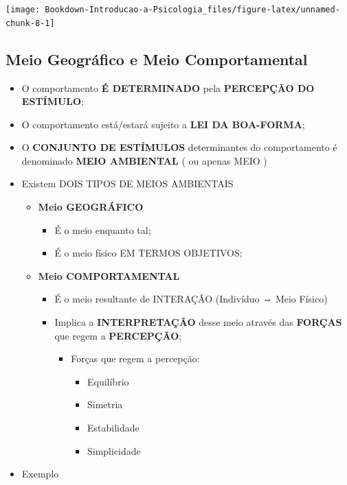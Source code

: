 \documentclass[
]{book}
\providecommand{\tightlist}{%
  \setlength{\itemsep}{0pt}\setlength{\parskip}{0pt}}
\begin{document}
\texttt{[image: Bookdown-Introducao-a-Psicologia\_files/figure-latex/unnamed-chunk-8-1]}

\hypertarget{meio-geogruxe1fico-e-meio-comportamental}{%
\subsection{Meio Geográfico e Meio Comportamental}\label{meio-geogruxe1fico-e-meio-comportamental}}

\begin{itemize}
\tightlist
\item
  O comportamento \textbf{É DETERMINADO} pela \textbf{PERCEPÇÃO DO
  ESTÍMULO};
\item
  O comportamento está/estará sujeito a \textbf{LEI DA BOA-FORMA};
\item
  O \textbf{CONJUNTO DE ESTÍMULOS} determinantes do comportamento é
  denominado \textbf{MEIO AMBIENTAL} ( ou apenas MEIO )
\item
  Existem DOIS TIPOS DE MEIOS AMBIENTAIS

  \begin{itemize}
  \tightlist
  \item
    \textbf{Meio GEOGRÁFICO}

    \begin{itemize}
    \tightlist
    \item
      É o meio enquanto tal;
    \item
      É o meio físico EM TERMOS OBJETIVOS;
    \end{itemize}
  \item
    \textbf{Meio COMPORTAMENTAL}

    \begin{itemize}
    \tightlist
    \item
      É o meio resultante de INTERAÇÃO (Indivíduo ⇔ Meio Físico)
    \item
      Implica a \textbf{INTERPRETAÇÃO} desse meio através das
      \textbf{FORÇAS} que regem a \textbf{PERCEPÇÃO};

      \begin{itemize}
      \tightlist
      \item
        Forças que regem a percepção:

        \begin{itemize}
        \tightlist
        \item
          Equilíbrio
        \item
          Simetria
        \item
          Estabilidade
        \item
          Simplicidade
        \end{itemize}
      \end{itemize}
    \end{itemize}
  \end{itemize}
\item
  Exemplo


\end{itemize}
\end{document}
